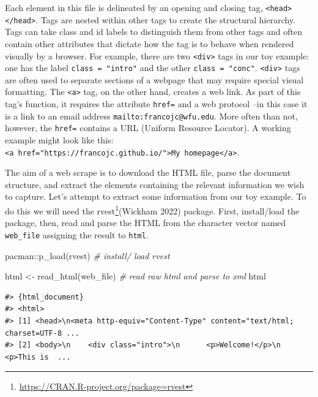 \documentclass[
  letterpaper,
]{scrbook}
\newenvironment{Shaded}{\begin{snugshade}}{\end{snugshade}}
\newcommand{\CommentTok}[1]{\textcolor[rgb]{0.00,0.00,0.00}{\textit{#1}}}
\newcommand{\FunctionTok}[1]{\textcolor[rgb]{0.00,0.00,0.00}{#1}}
\newcommand{\NormalTok}[1]{\textcolor[rgb]{0.00,0.00,0.00}{#1}}
\newcommand{\OtherTok}[1]{\textcolor[rgb]{0.00,0.00,0.00}{#1}}
\newcommand{\SpecialCharTok}[1]{\textcolor[rgb]{0.00,0.00,0.00}{#1}}
\DeclareRobustCommand{\href}[2]{#2\footnote{\url{#1}}}
\begin{document}
Each element in this file is delineated by an opening and closing tag,
\texttt{\textless{}head\textgreater{}\textless{}/head\textgreater{}}.
Tags are nested within other tags to create the structural hierarchy.
Tags can take class and id labels to distinguish them from other tags
and often contain other attributes that dictate how the tag is to behave
when rendered visually by a browser. For example, there are two
\texttt{\textless{}div\textgreater{}} tags in our toy example: one has
the label \texttt{class\ =\ "intro"} and the other
\texttt{class\ =\ "conc"}. \texttt{\textless{}div\textgreater{}} tags
are often used to separate sections of a webpage that may require
special visual formatting. The \texttt{\textless{}a\textgreater{}} tag,
on the other hand, creates a web link. As part of this tag's function,
it requires the attribute \texttt{href=} and a web protocol --in this
case it is a link to an email address \texttt{mailto:francojc@wfu.edu}.
More often than not, however, the \texttt{href=} contains a URL (Uniform
Resource Locator). A working example might look like this:
\texttt{\textless{}a\ href="https://francojc.github.io/"\textgreater{}My\ homepage\textless{}/a\textgreater{}}.

The aim of a web scrape is to download the HTML file, parse the document
structure, and extract the elements containing the relevant information
we wish to capture. Let's attempt to extract some information from our
toy example. To do this we will need the
\href{https://CRAN.R-project.org/package=rvest}{rvest}(Wickham 2022)
package. First, install/load the package, then, read and parse the HTML
from the character vector named \texttt{web\_file} assigning the result
to \texttt{html}.

\begin{Shaded}
\begin{Highlighting}[]
\NormalTok{pacman}\SpecialCharTok{::}\FunctionTok{p\_load}\NormalTok{(rvest) }\CommentTok{\# install/ load \textasciigrave{}rvest\textasciigrave{}}

\NormalTok{html }\OtherTok{\textless{}{-}} \FunctionTok{read\_html}\NormalTok{(web\_file) }\CommentTok{\# read raw html and parse to xml}
\NormalTok{html}
\end{Highlighting}
\end{Shaded}

\begin{verbatim}
#> {html_document}
#> <html>
#> [1] <head>\n<meta http-equiv="Content-Type" content="text/html; charset=UTF-8 ...
#> [2] <body>\n    <div class="intro">\n      <p>Welcome!</p>\n      <p>This is  ...
\end{verbatim}
\end{document}
